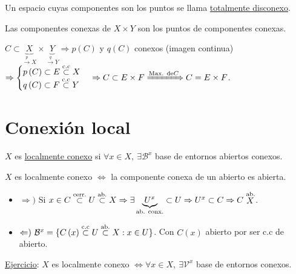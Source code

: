 \begin{defi}
Un espacio cuyas componentes son los puntos se llama \underline{totalmente disconexo}. 
\end{defi}

\begin{prop}
Las componentes conexas de $X \times Y$ son los puntos de componentes conexas.
\end{prop}
\begin{demo}
$C \subset \underbrace{X}_{\xrightarrow{p} X} \times \underbrace{Y}_{\xrightarrow{q} Y} \Rightarrow p\left( C \right)$ y $q\left( C \right)$ conexos (imagen continua) $\Rightarrow \begin{cases}
    p\left( C \right) \subset E \stackrel{\text{c.c}}{\subset}  X\\
    q\left( C \right) \subset F \stackrel{\text{c.c}}{\subset}  Y
\end{cases} \Rightarrow C \subset E \times F \xRightarrow{\text{Max. de} C} C = E\times F$.
\end{demo}

\section{Conexión local}%
\label{sec:conexion_local}
\begin{defi}
$X$ es \underline{localmente conexo}  si $\forall x \in X,\ \exists \mathcal{B}^x$ base de entornos abiertos conexos.
\end{defi}

\begin{prop}
$X$ es localmente conexo $\Leftrightarrow$ la componente conexa de un abierto es abierta.
\end{prop}
\begin{demo}
\begin{itemize}
    \item $\Rightarrow)$ Si $x \in C \stackrel{\text{cerr.}}{\subset} U \stackrel{\text{ab.}}{\subset} X \Rightarrow \exists \underbrace{U^x}_{\text{ab. conx.}} \subset U \Rightarrow U^x \subset C \Rightarrow C \stackrel{\text{ab.}}{X}$.
    \item $\Leftarrow)\ \mathcal{B}^x = \{C\left( x \right) \stackrel{\text{c.c}}{\subset} U \stackrel{\text{ab.}}{\subset} X : x \in U\}$. Con $C\left( x \right)$ abierto por ser c.c de abierto.
\end{itemize}
\end{demo}

\underline{Ejercicio}: $X$ es localmente conexo $\Leftrightarrow \forall x \in X,\ \exists \mathcal{V}^x$ base de entornos conexos.

